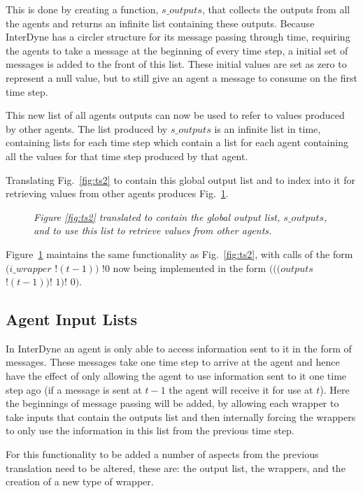 \documentclass{article}
\begin{document}
This is done by creating a function, $s\_outputs$, that collects the outputs from all the agents and returns an infinite list containing these outputs. Because InterDyne has a circler structure for its message passing through time, requiring the agents to take a message at the beginning of every time step, a initial set of messages is added to the front of this list. These initial values are set as zero to represent a null value, but to still give an agent a message to consume on the first time step. 

This new list of all agents outputs can now be used to refer to values produced by other agents. The list produced by $s\_outputs$ is an infinite list in time,  containing lists for each time step which contain a list for each agent containing all the values for that time step produced by that agent. 

Translating Fig.~\ref{fig:ts2} to contain this global output list and to index into it for retrieving values from other agents produces Fig.~\ref{fig:ts3}.
\begin{figure}[H]
	\centering
	
	\caption{\it  Figure \ref{fig:ts2} translated to contain the global output list, $s\_outputs$, and to use this list to retrieve values from other agents.}
	\label{fig:ts3}
\end{figure} 

Figure~\ref{fig:ts3} maintains the same functionality as Fig.~\ref{fig:ts2}, with calls of the form  $(i\_wrapper$ $! (t-1))$ $!0$ now being implemented in the form $(((outputs$ $!(t-1))!$ $1)!$ $0)$.

\subsection{Agent Input Lists}
In InterDyne an agent is only able to access information sent to it in the form of messages. These messages take one time step to arrive at the agent and hence have the effect of only allowing the agent to use information sent to it one time step ago (if a message is sent at $t-1$ the agent will receive it for use at $t$). Here the beginnings of message passing will be added, by allowing each wrapper to take inputs that contain the outputs list and then internally forcing the wrappers to only use the information in this list from the previous time step. 

For this functionality to be added a number of aspects from the previous translation need to be altered, these are: the output list, the wrappers, and the creation of a new type of wrapper.  
\end{document}
